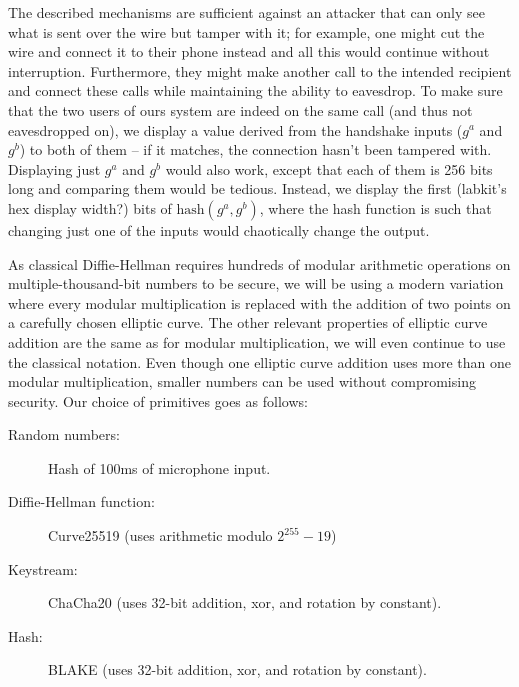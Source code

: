 \documentclass[a4paper]{report}
\begin{document}
The described mechanisms are sufficient against an attacker that can only see
what is sent over the wire but tamper with it; for example, one might cut the
wire and connect it to their phone instead and all this would continue without
interruption. Furthermore, they might make another call to the intended
recipient and connect these calls while maintaining the ability to eavesdrop. To
make sure that the two users of ours system are indeed on the same call (and
thus not eavesdropped on), we display a value derived from the handshake inputs
($g^a$ and $g^b$) to both of them -- if it matches, the connection hasn't been
tampered with. Displaying just $g^a$ and $g^b$ would also work, except that each
of them is 256 bits long and comparing them would be tedious. Instead, we
display the first (labkit's hex display width?) bits of $\text{hash}(g^a, g^b)$,
where the hash function is such that changing just one of the inputs would
chaotically change the output.

As classical Diffie-Hellman requires hundreds of modular arithmetic operations
on multiple-thousand-bit numbers to be secure, we will be using a modern
variation where every modular multiplication is replaced with the addition of
two points on a carefully chosen elliptic curve. The other relevant properties
of elliptic curve addition are the same as for modular multiplication, we will
even continue to use the classical notation. Even though one elliptic curve
addition uses more than one modular multiplication, smaller numbers can be used
without compromising security. Our choice of primitives goes as follows:

\begin{description}
  \item[Random numbers:] Hash of 100ms of microphone input.
  \item[Diffie-Hellman function:] Curve25519 (uses arithmetic modulo $2^{255}-19$)
  \item[Keystream:] ChaCha20 (uses 32-bit addition, xor, and rotation by constant).
  \item[Hash:] BLAKE (uses 32-bit addition, xor, and rotation by constant).
\end{description}
\end{document}
